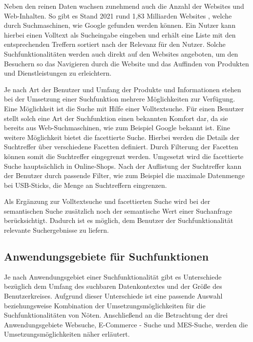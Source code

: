 Neben den reinen Daten wachsen zunehmend auch die Anzahl der Websites und Web-Inhalten. So gibt es Stand 2021 rund 1,83 Milliarden Websites \cite{GuyFawkes.2021}, welche durch Suchmaschinen, wie Google gefunden werden können. Ein Nutzer kann hierbei einen Volltext als Sucheingabe eingeben und erhält eine Liste mit den entsprechenden Treffern sortiert nach der Relevanz für den Nutzer. Solche Suchfunktionalitäten werden auch direkt auf den Websites angeboten, um den Besuchern so das Navigieren durch die Website und das Auffinden von Produkten und Dienstleistungen zu erleichtern.


Je nach Art der Benutzer und Umfang der Produkte und Informationen stehen bei der Umsetzung einer Suchfunktion mehrere Möglichkeiten zur Verfügung. Eine Möglichkeit ist die Suche mit Hilfe einer Volltextsuche. Für einen Benutzer stellt solch eine Art der Suchfunktion einen bekannten Komfort dar, da sie bereits aus Web-Suchmaschinen, wie zum Beispiel Google bekannt ist. Eine weitere Möglichkeit bietet die facettierte Suche. Hierbei werden die Details der Suchtreffer über verschiedene Facetten definiert. Durch Filterung der Facetten können somit die Suchtreffer eingegrenzt werden. Umgesetzt wird die facettierte Suche hauptsächlich in Online-Shops. Nach der Auflistung der Suchtreffer kann der Benutzer durch passende Filter, wie zum Beispiel die maximale Datenmenge bei USB-Sticks, die Menge an Suchtreffern eingrenzen.

Als Ergänzung zur Volltextsuche und facettierten Suche wird bei der semantischen Suche zusätzlich noch der semantische Wert einer Suchanfrage berücksichtigt. Dadurch ist es möglich, dem Benutzer der Suchfunktionalität relevante Suchergebnisse zu liefern.

\subsection{Anwendungsgebiete für Suchfunktionen\label{subsec2.1.1:Unterunterpunkt-1}}

Je nach Anwendungsgebiet einer Suchfunktionalität gibt es Unterschiede bezüglich dem Umfang des suchbaren Datenkontextes und der Größe des Benutzerkreises. Aufgrund dieser Unterschiede ist eine passende Auswahl beziehungsweise Kombination der Umsetzungsmöglichkeiten für die Suchfunktionalitäten von Nöten. Anschließend an die Betrachtung der drei Anwendungsgebiete \glqq Websuche\grqq{}, \glqq E-Commerce - Suche\grqq{} und \glqq MES-Suche\grqq{}, werden die Umsetzungsmöglichkeiten näher erläutert.

